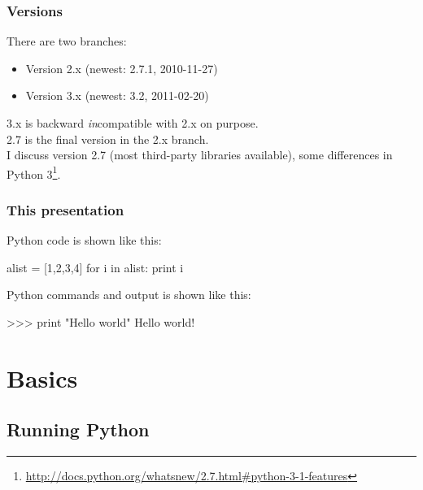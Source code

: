 \documentclass[xetex,10pt]{beamer}
\begin{document}
\begin{frame}
	\frametitle{Versions}
	
	There are two branches:
	
	\begin{itemize}
	\item Version 2.x (newest: 2.7.1, 2010-11-27)
	\item Version 3.x (newest: 3.2, 2011-02-20)
	\end{itemize}
	
	3.x is backward \emph{in}compatible with 2.x on purpose.\\
	2.7 is the final version in the 2.x branch.\\[2em]
	
	I discuss version 2.7 (most third-party libraries available), some differences in Python 3\footnote[frame]{\url{http://docs.python.org/whatsnew/2.7.html\#python-3-1-features}}.
	
\end{frame}

\begin{frame}[fragile]
	\frametitle{This presentation}
	
	Python code is shown like this:
\begin{python}
alist = [1,2,3,4]
for i in alist:
    print i
\end{python}
	
	\vspace*{1em}
	
	Python commands and output is shown like this:

\begin{python}
>>> print "Hello world"
Hello world!
\end{python}

\end{frame}


\section{Basics}

\subsection{Running Python}
\end{document}
